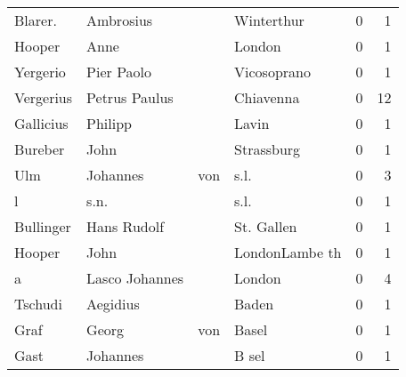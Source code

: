 \begin{tabular}{llllrr}
                  Blarer. &                          Ambrosius &             &                                  Winterthur &          0 &         1 \\
                   Hooper &                               Anne &             &                                      London &          0 &         1 \\
                 Yergerio &                         Pier Paolo &             &                                 Vicosoprano &          0 &         1 \\
                Vergerius &                      Petrus Paulus &             &                                   Chiavenna &          0 &        12 \\
                Gallicius &                            Philipp &             &                                       Lavin &          0 &         1 \\
                  Bureber &                               John &             &                                  Strassburg &          0 &         1 \\
                      Ulm &                           Johannes &         von &                                        s.l. &          0 &         3 \\
                        l &                               s.n. &             &                                        s.l. &          0 &         1 \\
                Bullinger &                        Hans Rudolf &             &                                  St. Gallen &          0 &         1 \\
                   Hooper &                               John &             &                              LondonLambe th &          0 &         1 \\
                        a &                     Lasco Johannes &             &                                      London &          0 &         4 \\
                  Tschudi &                           Aegidius &             &                                       Baden &          0 &         1 \\
                     Graf &                              Georg &         von &                                       Basel &          0 &         1 \\
                     Gast &                           Johannes &             &                                       B sel &          0 &         1 \\

\end{tabular}
